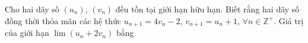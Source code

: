 \begin{ex}
Cho hai dãy số $(u_n)$, $(v_n)$ đều tồn tại giới hạn hữu hạn. Biết rằng hai dãy số đồng thời thỏa mãn các hệ thức $u_{n+1}=4v_n-2$, $v_{n+1}=u_n+1$, $\forall n\in\mathbb Z^+$. Giá trị của giới hạn $\lim(u_n+2v_n)$ bằng
\end{ex}
